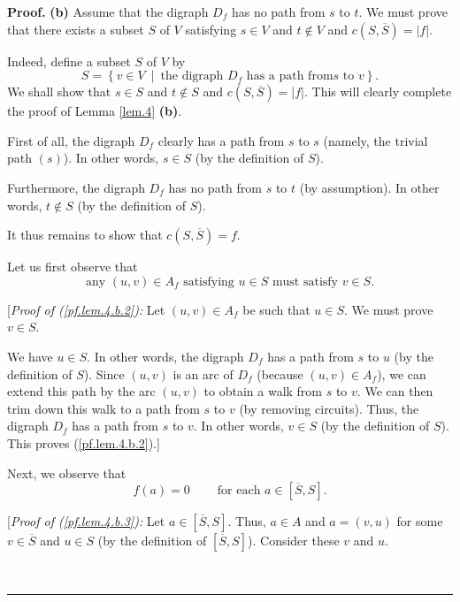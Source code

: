 \documentclass[numbers=enddot,12pt,final,onecolumn,notitlepage]{scrartcl}%
\theoremstyle{definition}
\newenvironment{proof}[1][Proof]{\noindent\textbf{#1.} }{\ \rule{0.5em}{0.5em}}
\begin{document}
\begin{proof}
\textbf{(b)} Assume that the digraph $D_{f}$ has no path from $s$ to $t$. We
must prove that there exists a subset $S$ of $V$ satisfying $s\in V$ and
$t\notin V$ and $c\left(  S,\overline{S}\right)  =\left\vert f\right\vert $.

Indeed, define a subset $S$ of $V$ by%
\[
S=\left\{  v\in V\ \mid\ \text{the digraph }D_{f}\text{ has a path from
}s\text{ to }v\right\}  .
\]
We shall show that $s\in S$ and $t\notin S$ and $c\left(  S,\overline
{S}\right)  =\left\vert f\right\vert $. This will clearly complete the proof
of Lemma \ref{lem.4} \textbf{(b)}.

First of all, the digraph $D_{f}$ clearly has a path from $s$ to $s$ (namely,
the trivial path $\left(  s\right)  $). In other words, $s\in S$ (by the
definition of $S$).

Furthermore, the digraph $D_{f}$ has no path from $s$ to $t$ (by assumption).
In other words, $t\notin S$ (by the definition of $S$).

It thus remains to show that $c\left(  S,\overline{S}\right)  =f$.

Let us first observe that%
\begin{equation}
\text{any }\left(  u,v\right)  \in A_{f}\text{ satisfying }u\in S\text{ must
satisfy }v\in S. \label{pf.lem.4.b.2}%
\end{equation}


[\textit{Proof of (\ref{pf.lem.4.b.2}):} Let $\left(  u,v\right)  \in A_{f}$
be such that $u\in S$. We must prove $v\in S$.

We have $u\in S$. In other words, the digraph $D_{f}$ has a path from $s$ to
$u$ (by the definition of $S$). Since $\left(  u,v\right)  $ is an arc of
$D_{f}$ (because $\left(  u,v\right)  \in A_{f}$), we can extend this path by
the arc $\left(  u,v\right)  $ to obtain a walk from $s$ to $v$. We can then
trim down this walk to a path from $s$ to $v$ (by removing circuits). Thus,
the digraph $D_{f}$ has a path from $s$ to $v$. In other words, $v\in S$ (by
the definition of $S$). This proves (\ref{pf.lem.4.b.2}).]

Next, we observe that%
\begin{equation}
f\left(  a\right)  =0\ \ \ \ \ \ \ \ \ \ \text{for each }a\in\left[
\overline{S},S\right]  . \label{pf.lem.4.b.3}%
\end{equation}


[\textit{Proof of (\ref{pf.lem.4.b.3}):} Let $a\in\left[  \overline
{S},S\right]  $. Thus, $a\in A$ and $a=\left(  v,u\right)  $ for some
$v\in\overline{S}$ and $u\in S$ (by the definition of $\left[  \overline
{S},S\right]  $). Consider these $v$ and $u$.


\end{proof}
\end{document}
